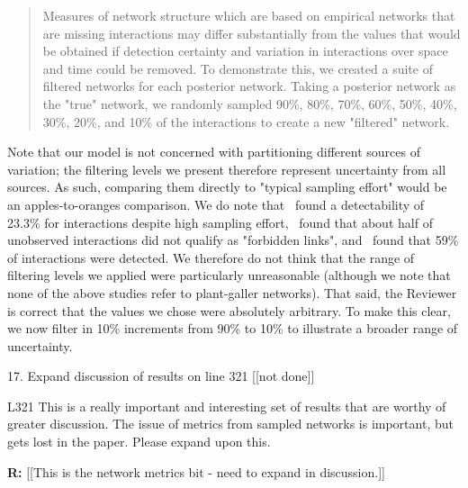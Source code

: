 \documentclass[12pt]{letter}
\newenvironment{refquote}{\bigskip \begin{it}}{\end{it}\smallskip}
\begin{document}
			\begin{quotation}
				Measures of network structure which are based on empirical networks that are missing interactions may differ substantially from the values that would be obtained if detection certainty and variation in interactions over space and time could be removed. To demonstrate this, we created a suite of filtered networks for each posterior network. Taking a posterior network as the "true" network, we randomly sampled 90\%, 80\%, 70\%, 60\%, 50\%, 40\%, 30\%, 20\%, and 10\% of the interactions to create a new "filtered" network.
			\end{quotation}


		Note that our model is not concerned with partitioning different sources of variation; the filtering levels we present therefore represent uncertainty from all sources. As such, comparing them directly to "typical sampling effort" would be an apples-to-oranges comparison. We do note that~\citet{Weinstein2017a} found a detectability of 23.3\% for interactions despite high sampling effort,~\citet{Jordano2016} found that about half of unobserved interactions did not qualify as "forbidden links", and~\citet{Bartomeus2013} found that 59\% of interactions were detected. We therefore do not think that the range of filtering levels we applied were particularly unreasonable (although we note that none of the above studies refer to plant-galler networks). That said, the Reviewer is correct that the values we chose were absolutely arbitrary. To make this clear, we now filter in 10\% increments from 90\% to 10\% to illustrate a broader range of uncertainty.


	17. Expand discussion of results on line 321 [[not done]]

		\begin{refquote}
		L321 This is a really important and interesting set of results that are worthy of greater discussion. The issue of metrics from sampled networks is important, but gets lost in the paper. Please expand upon this.
		\end{refquote}

		\textbf{R:} [[This is the network metrics bit - need to expand in discussion.]]


\clearpage
\end{document}
